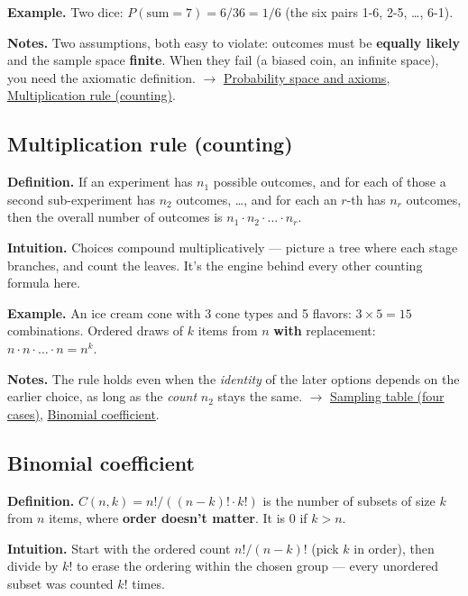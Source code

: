 \documentclass[11pt,a4paper]{article}
\begin{document}
\textbf{Example.} Two dice: $P(\text{sum} = 7) = 6/36 = 1/6$ (the six pairs 1-6, 2-5, \ldots{}, 6-1).

\textbf{Notes.} Two assumptions, both easy to violate: outcomes must be \textbf{equally likely} and the sample space \textbf{finite}. When they fail (a biased coin, an infinite space), you need the axiomatic definition. $\to$ \hyperref[sec:probability-space-and-axioms]{Probability space and axioms}, \hyperref[sec:multiplication-rule-counting]{Multiplication rule (counting)}.

\subsection{Multiplication rule (counting)}\label{sec:multiplication-rule-counting}

\textbf{Definition.} If an experiment has $n_{1}$ possible outcomes, and for each of those a second sub-experiment has $n_{2}$ outcomes, \ldots{}, and for each an $r$-th has $n_r$ outcomes, then the overall number of outcomes is $n_{1} \cdot  n_{2} \cdot  \ldots  \cdot  n_r$.

\textbf{Intuition.} Choices compound multiplicatively --- picture a tree where each stage branches, and count the leaves. It's the engine behind every other counting formula here.

\textbf{Example.} An ice cream cone with 3 cone types and 5 flavors: $3 \times  5 = 15$ combinations. Ordered draws of $k$ items from $n$ \textbf{with} replacement: $n \cdot  n \cdot  \ldots  \cdot  n = n^{k}$.

\textbf{Notes.} The rule holds even when the \textit{identity} of the later options depends on the earlier choice, as long as the \textit{count} $n_{2}$ stays the same. $\to$ \hyperref[sec:sampling-table-four-cases]{Sampling table (four cases)}, \hyperref[sec:binomial-coefficient]{Binomial coefficient}.

\subsection{Binomial coefficient}\label{sec:binomial-coefficient}

\textbf{Definition.} $C(n, k) = n! / ((n-k)! \cdot  k!)$ is the number of subsets of size $k$ from $n$ items, where \textbf{order doesn't matter}. It is 0 if $k > n$.

\textbf{Intuition.} Start with the ordered count $n!/(n-k)!$ (pick $k$ in order), then divide by $k!$ to erase the ordering within the chosen group --- every unordered subset was counted $k!$ times.
\end{document}
